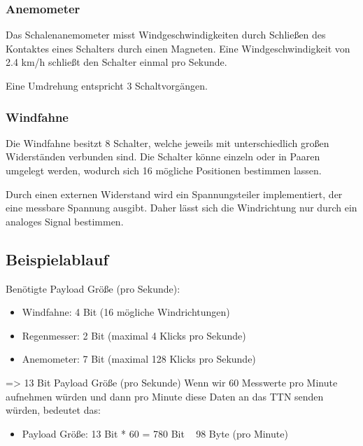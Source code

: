 \documentclass{article}
\begin{document}
      \subsubsection{Anemometer}

        Das Schalenanemometer misst Windgeschwindigkeiten durch Schließen des Kontaktes eines Schalters durch einen Magneten.
        Eine Windgeschwindigkeit von 2.4 km/h schließt den Schalter einmal pro Sekunde.

        Eine Umdrehung entspricht 3 Schaltvorgängen.

      \subsubsection{Windfahne}

        Die Windfahne besitzt 8 Schalter, welche jeweils mit unterschiedlich großen Widerständen verbunden sind.
        Die Schalter könne einzeln oder in Paaren umgelegt werden, wodurch sich 16 mögliche Positionen bestimmen lassen.

        Durch einen externen Widerstand wird ein Spannungsteiler implementiert, der eine messbare Spannung ausgibt.
        Daher lässt sich die Windrichtung nur durch ein analoges Signal bestimmen.

    \subsection{Beispielablauf}

      Benötigte Payload Größe (pro Sekunde):

      \begin{itemize}
        \item Windfahne: 4 Bit (16 mögliche Windrichtungen)
        \item Regenmesser: 2 Bit (maximal 4 Klicks pro Sekunde)
        \item Anemometer: 7 Bit (maximal 128 Klicks pro Sekunde)
      \end{itemize}

      => 13 Bit Payload Größe (pro Sekunde)
      Wenn wir 60 Messwerte pro Minute aufnehmen würden und dann pro Minute diese Daten an das TTN senden würden, bedeutet das:

      \begin{itemize}
        \item Payload Größe: 13 Bit * 60 = 780 Bit ~ 98 Byte (pro Minute)
      \end{itemize}
\end{document}

